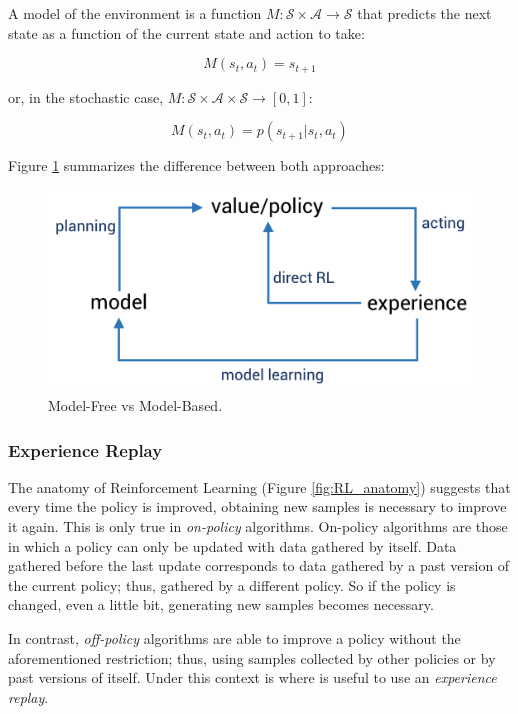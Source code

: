 A model of the environment is a function $M: \mathcal{S} \times \mathcal{A} \to \mathcal{S}$ that predicts the next state as a function of the current state and action to take:

\begin{equation} \label{eq:model}
    M(s_{t},a_{t}) = s_{t+1}  
\end{equation}

or, in the stochastic case, $M: \mathcal{S} \times \mathcal{A} \times \mathcal{S} \to [0, 1]$:

\begin{equation}
    M(s_{t},a_{t}) = p(s_{t+1}|s_{t},a_{t})  
\end{equation}

Figure \ref{fig:free_based_model} summarizes the difference between both approaches:

\begin{figure}[h]
    \centering
    \includegraphics[width=0.6\linewidth]{imagenes/cap1/free_based_model.pdf}
    \caption{Model-Free vs Model-Based.}
    \label{fig:free_based_model}
\end{figure}

\subsubsection[Experience Replay]{Experience Replay \cite{atari, lin1993reinforcement, zhang2017deeper}}
\label{sss:ER}

The anatomy of Reinforcement Learning (Figure \ref{fig:RL_anatomy}) suggests that every time the policy is improved, obtaining new samples is necessary to improve it again. This is only true in \emph{on-policy} algorithms. On-policy algorithms are those in which a policy can only be updated with data gathered by itself. Data gathered before the last update corresponds to data gathered by a past version of the current policy; thus, gathered by a different policy. So if the policy is changed, even a little bit, generating new samples becomes necessary. 

In contrast, \emph{off-policy} algorithms are able to improve a policy without the aforementioned restriction; thus, using samples collected by other policies or by past versions of itself. Under this context is where is useful to use an \emph{experience replay}.

